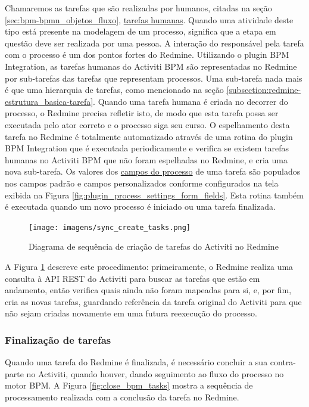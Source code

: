Chamaremos as tarefas que são realizadas por humanos, citadas na seção \ref{sec:bpm-bpmn_objetos_fluxo}, \underline{tarefas humanas}. Quando uma atividade deste tipo está presente na modelagem de um processo, significa que a etapa em questão deve ser realizada por uma pessoa. A interação do responsável pela tarefa com o processo é um dos pontos fortes do Redmine. Utilizando o plugin BPM Integration, as tarefas humanas do Activiti BPM são representadas no Redmine por sub-tarefas das tarefas que representam processos. Uma sub-tarefa nada mais é que uma hierarquia de tarefas, como mencionado na seção \ref{subsection:redmine-estrutura_basica-tarefa}.
Quando uma tarefa humana é criada no decorrer do processo, o Redmine precisa refletir isto, de modo que esta tarefa possa ser executada pelo ator correto e o processo siga seu curso. O espelhamento desta tarefa no Redmine é totalmente automatizado através de uma rotina do plugin BPM Integration que é executada periodicamente e verifica se existem tarefas humanas no Activiti BPM que não foram espelhadas no Redmine, e cria uma nova sub-tarefa. Os valores dos \underline{campos do processo} de uma tarefa são populados nos campos padrão e campos personalizados conforme configurados na tela exibida na Figura \ref{fig:plugin_process_settings_form_fields}. Esta rotina também é executada quando um novo processo é iniciado ou uma tarefa finalizada.

\begin{figure}[H]
\centering
\texttt{[image: imagens/sync\_create\_tasks.png]}
\caption{Diagrama de sequência de criação de tarefas do Activiti no Redmine}
\label{fig:sync_bpm_tasks}
\end{figure}

A Figura \ref{fig:sync_bpm_tasks} descreve este procedimento: primeiramente, o Redmine realiza uma consulta à API REST do Activiti para buscar as tarefas que estão em andamento, então verifica quais ainda não foram mapeadas para si, e, por fim, cria as novas tarefas, guardando referência da tarefa original do Activiti para que não sejam criadas novamente em uma futura reexecução do processo.

\subsubsection{Finalização de tarefas}\label{sec:integracao_redmine_activiti_sincronizacao-finalizacao_human_task}

Quando uma tarefa do Redmine é finalizada, é necessário concluir a sua contra-parte no Activiti, quando houver, dando seguimento ao fluxo do processo no motor BPM. A Figura \ref{fig:close_bpm_tasks} mostra a sequência de processamento realizada com a conclusão da tarefa no Redmine.

